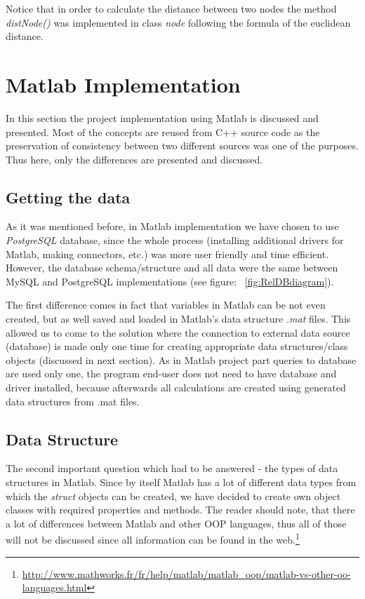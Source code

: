 \documentclass{article}
\begin{document}
Notice that in order to calculate the distance between two nodes the method \textit{distNode()} was implemented in class \textit{node } following the formula of the euclidean distance. 

\clearpage
\section{Matlab Implementation}
       
In this section the project implementation using Matlab is discussed and presented. Most of the concepts are reused from C++ source code as the preservation of consistency between two different sources was one of the purposes. Thus here, only the differences are presented and discussed.

\subsection{Getting the data}

As it was mentioned before, in Matlab implementation we have chosen to use \textit{PostgreSQL} database, since the whole process (installing additional drivers for Matlab, making connectors, etc.) was more user friendly and time efficient. However, the database schema/structure and all data were the same between MySQL and PostgreSQL implementations (see figure: ~\ref{fig:RelDBdiagram}).

The first difference comes in fact that variables in Matlab can be not even created, but as well saved and loaded in Matlab's data structure \textit{.mat} files. This allowed us to come to the solution where the connection to external data source (database) is made only one time for creating appropriate data structures/class objects (discussed in next section). As in Matlab project part queries to database are used only one, the program end-user does not need to have database and driver installed, because afterwards all calculations are created using generated data structures from .mat files.

\subsection{Data Structure}

The second important question which had to be answered - the types of data structures in Matlab.
Since by itself Matlab has a lot of different data types from which the \textit{struct} objects can be created, we have decided to create own object classes with required properties and methods. The reader should note, that there a lot of differences between Matlab and other OOP languages, thus all of those will not be discussed since all information can be found in the web.\footnote{
\url{http://www.mathworks.fr/fr/help/matlab/matlab_oop/matlab-vs-other-oo-languages.html}
}
\end{document}
